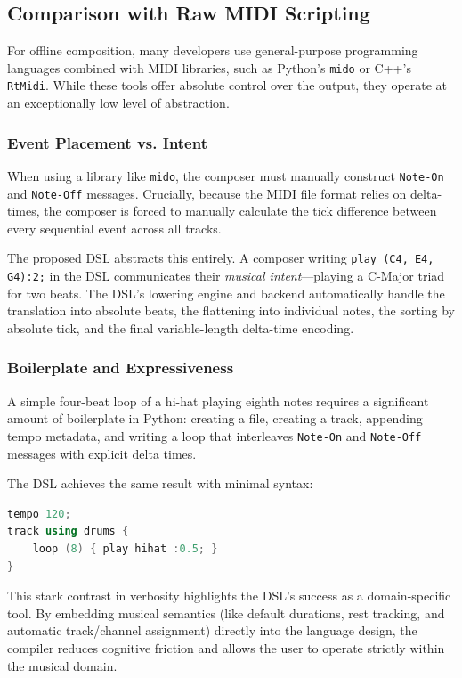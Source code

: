 \subsection{Comparison with Raw MIDI Scripting}\label{subsec:comparison-with-raw-midi-scripting}

For offline composition, many developers use general-purpose programming languages combined with MIDI libraries, such as
Python's \texttt{mido} or C++'s \texttt{RtMidi}.
While these tools offer absolute control over the output, they operate at an exceptionally low level of abstraction.

\subsubsection{Event Placement vs. Intent}
When using a library like \texttt{mido}, the composer must manually construct \texttt{Note-On} and \texttt{Note-Off}
messages.
Crucially, because the MIDI file format relies on delta-times, the composer is forced to manually calculate the tick
difference between every sequential event across all tracks.

The proposed DSL abstracts this entirely.
A composer writing \texttt{play (C4, E4, G4):2;} in the DSL communicates their \textit{musical intent}---playing a
C-Major triad for two beats.
The DSL's lowering engine and backend automatically handle the translation into absolute beats, the flattening into
individual notes, the sorting by absolute tick, and the final variable-length delta-time encoding.

\subsubsection{Boilerplate and Expressiveness}
A simple four-beat loop of a hi-hat playing eighth notes requires a significant amount of boilerplate in Python:
creating a file, creating a track, appending tempo metadata, and writing a loop that interleaves \texttt{Note-On} and
\texttt{Note-Off} messages with explicit delta times.

The DSL achieves the same result with minimal syntax:
\begin{lstlisting}[language=C++,label={lst:lstlisting3}]
tempo 120;
track using drums {
    loop (8) { play hihat :0.5; }
}
\end{lstlisting}

This stark contrast in verbosity highlights the DSL's success as a domain-specific tool.
By embedding musical semantics (like default durations, rest tracking, and automatic track/channel assignment) directly
into the language design, the compiler reduces cognitive friction and allows the user to operate strictly within the
musical domain.
